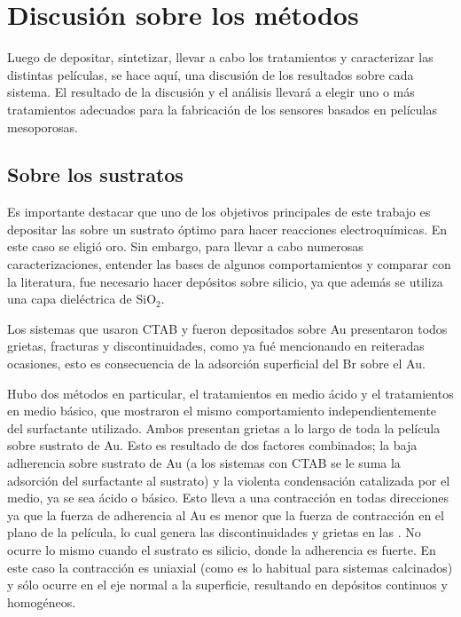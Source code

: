 \section{Discusión sobre los métodos}
		
			Luego de depositar, sintetizar, llevar a cabo los tratamientos y caracterizar las distintas películas, se hace aquí, una discusión de los resultados sobre cada sistema. El resultado de la discusión y el análisis llevará a elegir uno o más tratamientos adecuados para la fabricación de los sensores basados en películas mesoporosas.

	\subsection{Sobre los sustratos}

			Es importante destacar que uno de los objetivos principales de este trabajo es depositar las \pdm\space sobre un sustrato óptimo para hacer reacciones electroquímicas. En este caso se eligió oro. Sin embargo, para llevar a cabo numerosas caracterizaciones, entender las bases de algunos comportamientos y comparar con la literatura, fue necesario hacer depósitos sobre silicio, ya que además se utiliza una capa dieléctrica de SiO$_2$.

			Los sistemas que usaron CTAB y fueron depositados sobre Au presentaron todos grietas, fracturas y discontinuidades, como ya fué mencionando en reiteradas ocasiones, esto es consecuencia de la adsorción superficial del Br sobre el Au. 

			Hubo dos métodos en particular, el tratamientos en medio ácido y el tratamientos en medio básico, que mostraron el mismo comportamiento independientemente del surfactante utilizado. Ambos presentan grietas a lo largo de toda la película sobre sustrato de Au. Esto es resultado de dos factores combinados; la baja adherencia sobre sustrato de Au (a los sistemas con CTAB se le suma la adsorción del surfactante al sustrato) y la violenta condensación catalizada por el medio, ya se sea ácido o básico. Esto lleva a una contracción en todas direcciones ya que la fuerza de adherencia al Au es menor que la fuerza de contracción en el plano de la película, lo cual genera las discontinuidades y grietas en las \pdm. No ocurre lo mismo cuando el sustrato es silicio, donde la adherencia es fuerte. En este caso la contracción es uniaxial (como es lo habitual para sistemas calcinados) y sólo ocurre en el eje normal a la superficie, resultando en depósitos continuos y homogéneos.

